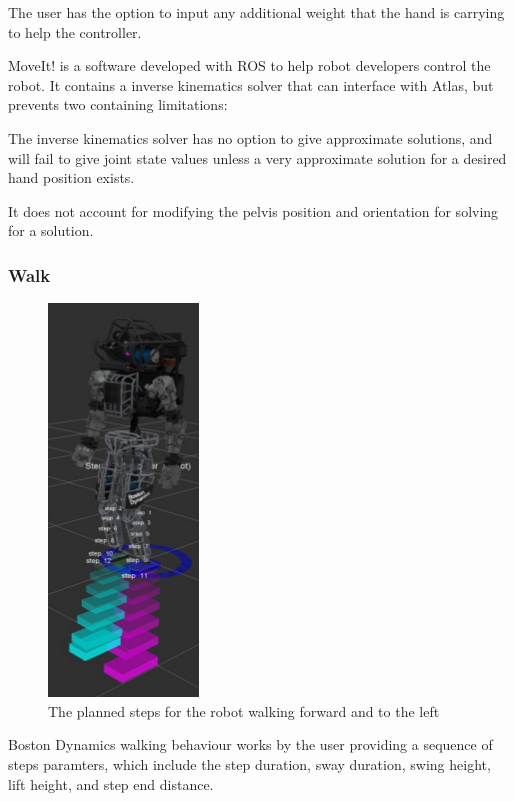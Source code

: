 \documentclass{article}
\begin{document}
The user has the option to input any additional weight that the hand is carrying to help the controller.

MoveIt! is a software developed with ROS to help robot developers control the robot. It contains a inverse kinematics solver that can interface with Atlas, but prevents two containing limitations: 
\begin{inparaenum}
\item The inverse kinematics solver has no option to give approximate solutions, and will fail to give joint state values unless a very approximate solution for a desired hand position exists.
\item It does not account for modifying the pelvis position and orientation for solving for a solution. \end{inparaenum}
 
\subsubsection{Walk}

\begin{figure}
  \begin{center}
    \includegraphics[scale=0.5]{images/step_gui.png}
  \end{center}
  \caption{The planned steps for the robot walking forward and to the left}
\end{figure}


Boston Dynamics walking behaviour works by the user providing a sequence of steps paramters, which include the step duration, sway duration, swing height, lift height, and step end distance.  
\end{document}
